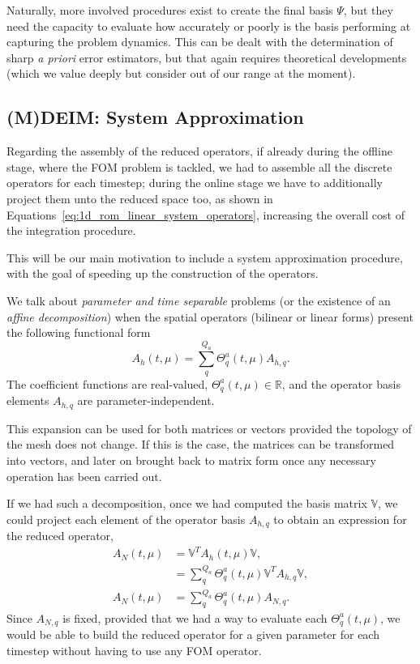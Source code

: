 \documentclass[../../thesis.tex]{subfiles}
\newcommand{\rbV}{\ensuremath{\mathbb{V}}}
\newcommand{\rbVT}{\ensuremath{\rbV^T}}
\begin{document}
Naturally, more involved procedures exist to create the final basis $\Psi$, 
but they need the capacity to evaluate how accurately or poorly 
is the basis performing at capturing the problem dynamics.
This can be dealt with the determination of sharp \emph{a priori} error estimators,
but that again requires theoretical developments 
(which we value deeply but consider out of our range at the moment).


\subsection{(M)DEIM: System Approximation}
\label{sec:1d_rom_burgers_system_approximation_deim}
Regarding the assembly of the reduced operators, if already during the offline stage, where the FOM problem is tackled, we had to assemble all the discrete operators for each timestep;
during the online stage we have to additionally project them unto the reduced space too, as shown in Equations~\eqref{eq:1d_rom_linear_system_operators},
increasing the overall cost of the integration procedure.

This will be our main motivation to include a system approximation procedure,
with the goal of speeding up the construction of the operators.

We talk about \emph{parameter and time separable} problems 
(or the existence of an \emph{affine decomposition})
when the spatial operators (bilinear or linear forms)
present the following functional form
\begin{equation}
    \label{eq:1d_rom_burgers_separable_form_time_param}
    A_h(t, \mu) = \sum_q^{Q_a} \Theta_q^a(t, \mu) A_{h,q}.
\end{equation}
The coefficient functions are real-valued, \mbox{$\Theta_q^a(t, \mu) \in \mathbb{R}$}, 
and the operator basis elements $A_{h,q}$ are parameter-independent.

This expansion can be used for both matrices or vectors provided 
the topology of the mesh does not change.
If this is the case, the matrices can be transformed into vectors, 
and later on brought back to matrix form once any necessary operation has been carried out.

If we had such a decomposition, once we had computed the basis matrix \rbV, we could project each element of the operator basis $A_{h, q}$ to obtain an expression for the reduced operator, 
\begin{equation}
    \begin{split}
        A_N(t, \mu) &= \rbVT A_h(t, \mu) \rbV,
        \\ 
        &= \sum_q^{Q_a} \Theta_q^a(t, \mu) \rbVT  A_{h, q} \rbV, 
        \\
        A_N(t, \mu) &= \sum_q^{Q_a} \Theta_q^a(t, \mu) A_{N,q}.
    \end{split}
\end{equation}
Since $A_{N, q}$ is fixed, provided that we had a way to evaluate each $\Theta_q^a(t, \mu)$, we would be able to build the reduced operator for a given parameter for each timestep without having to use any FOM operator. 
\end{document}
